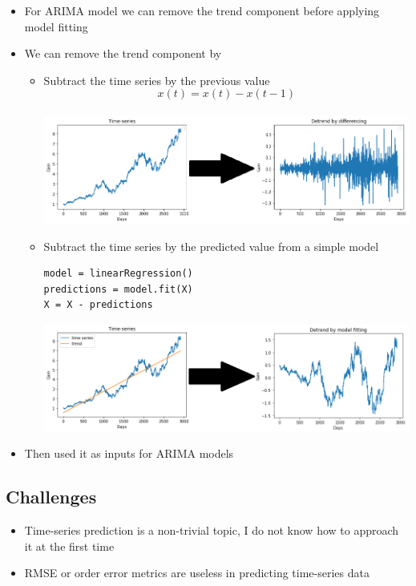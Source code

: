 \documentclass[11pt]{article}
\makeatletter
\def\maxwidth{\ifdim\Gin@nat@width>\linewidth\linewidth
    \else\Gin@nat@width\fi}
\let\Oldincludegraphics\includegraphics
\renewcommand{\includegraphics}[1]{\Oldincludegraphics[width=.8\maxwidth]{#1}}
\providecommand{\tightlist}{%
      \setlength{\itemsep}{0pt}\setlength{\parskip}{0pt}}
\makeatother
\begin{document}
\begin{itemize}
\tightlist
\item
  For ARIMA model we can remove the trend component before applying
  model fitting
\item
  We can remove the trend component by

  \begin{itemize}
  \item
    Subtract the time series by the previous value
    \[ x(t) = x(t) - x(t-1)\] \\
    \includegraphics{./figures/31.jpg}
  \item
    Subtract the time series by the predicted value from a simple model

\begin{verbatim}
model = linearRegression()
predictions = model.fit(X)
X = X - predictions
\end{verbatim}

    \includegraphics{./figures/32.jpg}
  \end{itemize}
\item
  Then used it as inputs for ARIMA models
\end{itemize}

\subsection{Challenges}\label{challenges}

\begin{itemize}
\tightlist
\item
  Time-series prediction is a non-trivial topic, I do not know how to
  approach it at the first time
\item
  RMSE or order error metrics are useless in predicting time-series data
\end{itemize}
\end{document}
